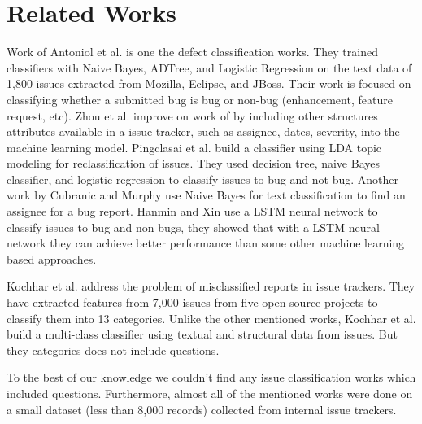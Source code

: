 \documentclass[conference]{IEEEtran}
\begin{document}
\section{Related Works}\label{relworks}

Work of Antoniol et al. \cite{10.1145/1463788.1463819} is one the defect classification works. They trained  
classifiers with Naive Bayes, ADTree, and Logistic Regression on the text data of 1,800 issues extracted 
from Mozilla, Eclipse, and JBoss. Their work is focused on classifying whether a submitted bug is bug or 
non-bug (enhancement, feature request, etc). Zhou et al. \cite{6976097} improve on work 
of \cite{10.1145/1463788.1463819} by including other structures attributes available in a issue tracker,
such as assignee, dates, severity, into the machine learning model. Pingclasai et al. \cite{6754344} build a 
classifier using LDA topic modeling for reclassification of issues. 
They used decision tree, naive Bayes classifier, and logistic regression to classify issues to bug and not-bug. 
Another work by Cubranic and Murphy \cite{1814517} use Naive Bayes for text classification 
to find an assignee for a bug report. Hanmin and Xin use a LSTM neural network \cite{10.1145/3275219.3275239}
to classify issues to bug and non-bugs, they showed that with a LSTM neural network they can achieve better 
performance than some other machine learning based approaches.

Kochhar et al. \cite{6923127} address the problem of misclassified reports in issue trackers. They have 
extracted features from 7,000 issues from five open source projects to classify them into 13 categories. Unlike
the other mentioned works, Kochhar et al. build a multi-class classifier using textual and structural data from 
issues. But they categories does not include questions.

To the best of our knowledge we couldn't find any issue classification works which included questions. Furthermore, 
almost all of the mentioned works were done on a small dataset (less than 8,000 records) 
collected from internal issue trackers.
\end{document}
